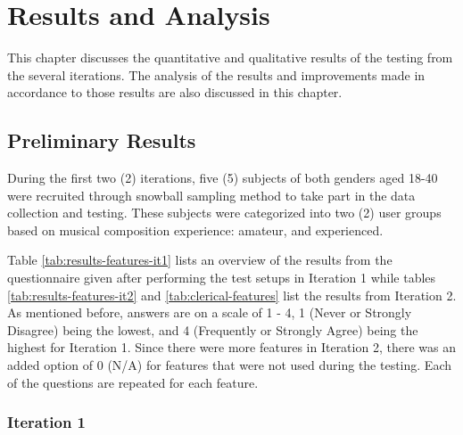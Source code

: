 
\chapter{Results and Analysis}

	This chapter discusses the quantitative and qualitative results of the testing from the several iterations. The analysis of the results and improvements made in accordance to those results are also discussed in this chapter.

	\section{Preliminary Results}
		During the first two (2) iterations, five (5) subjects of both genders aged 18-40 were recruited through snowball sampling method to take part in the data collection and testing. These subjects were categorized into two (2) user groups based on musical composition experience: amateur, and experienced.

		Table \ref{tab:results-features-it1} lists an overview of the results from the questionnaire given after performing the test setups in Iteration 1 while tables \ref{tab:results-features-it2} and \ref{tab:clerical-features} list the results from Iteration 2. As mentioned before, answers are on a scale of 1 - 4, 1 (Never or Strongly Disagree) being the lowest, and 4 (Frequently or Strongly Agree) being the highest for Iteration 1. Since there were more features in Iteration 2, there was an added option of 0 (N/A) for features that were not used during the testing. Each of the questions are repeated for each feature.

		\subsection{Iteration 1} 

